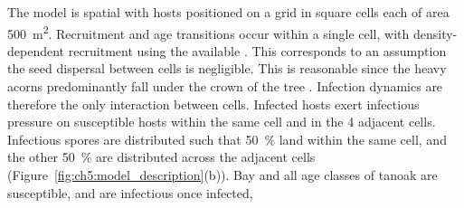 The model is spatial with hosts positioned on a grid in square cells each of area \SI{500}{\meter\squared}. Recruitment and age transitions occur within a single cell, with density-dependent recruitment using the available . This corresponds to an assumption the seed dispersal between cells is negligible. This is reasonable since the heavy acorns predominantly fall under the crown of the tree \citep{tappeiner_lithocarpus_1990}. Infection dynamics are therefore the only interaction between cells. Infected hosts exert infectious pressure on susceptible hosts within the same cell and in the 4 adjacent cells. Infectious spores are distributed such that \SI{50}{\percent} land within the same cell, and the other \SI{50}{\percent} are distributed across the adjacent cells (Figure~\ref{fig:ch5:model_description}(b)). Bay and all age classes of tanoak are susceptible, and are infectious once infected, 

